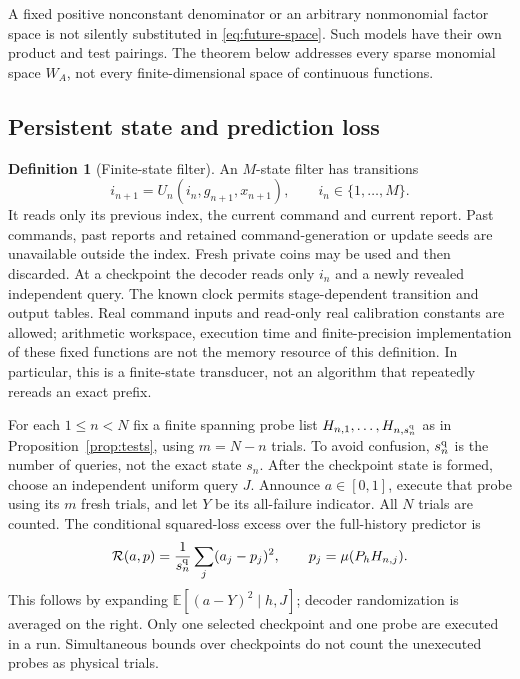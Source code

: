 \documentclass[11pt]{amsart}
\theoremstyle{definition}\newtheorem{definition}[theorem]{Definition}
\theoremstyle{remark}\newtheorem{remark}[theorem]{Remark}
\newcommand{\E}{\mathbb E}\newcommand{\Prob}{\mathbb P}
\begin{document}
A fixed positive nonconstant denominator or an arbitrary nonmonomial
factor space is not silently substituted in \eqref{eq:future-space}.
Such models have their own product and test pairings. The theorem below
addresses every sparse monomial space $W_A$, not every finite-dimensional
space of continuous functions.

\subsection{Persistent state and prediction loss}
\begin{definition}[Finite-state filter]\label{def:finite-state}
An $M$-state filter has transitions
\[
 i_{n+1}=U_n(i_n,g_{n+1},x_{n+1}),\qquad i_n\in\{1,\ldots,M\}.
\]
It reads only its previous index, the current command and current report.
Past commands, past reports and retained command-generation or update seeds
are unavailable outside the index. Fresh private coins may be used and
then discarded. At a checkpoint the decoder reads only $i_n$ and a newly
revealed independent query. The known clock permits stage-dependent
transition and output tables. Real command inputs and read-only real
calibration constants are allowed; arithmetic workspace, execution time and
finite-precision implementation of these fixed functions are not the memory
resource of this definition. In particular, this is a finite-state
transducer, not an algorithm that repeatedly rereads an exact prefix.
\end{definition}

For each $1\le n<N$ fix a finite spanning probe list
$H_{n,1},\ldots,H_{n,s_n^{\rm q}}$ as in
Proposition~\ref{prop:tests}, using $m=N-n$ trials. To avoid confusion,
$s_n^{\rm q}$ is the number of queries, not the exact state $s_n$.
After the checkpoint state is formed, choose an independent uniform query
$J$. Announce $a\in[0,1]$, execute that probe using its $m$ fresh trials,
and let $Y$ be its all-failure indicator. All $N$ trials are counted.
The conditional squared-loss excess over the full-history predictor is
\begin{equation}\label{eq:brier}
 \mathcal R(a,p)=\frac1{s_n^{\rm q}}\sum_j(a_j-p_j)^2,
 \qquad p_j=\mu(P_hH_{n,j}).
\end{equation}
This follows by expanding $\E[(a-Y)^2\mid h,J]$; decoder randomization
is averaged on the right. Only one selected checkpoint and one probe are
executed in a run. Simultaneous bounds over checkpoints do not count the
unexecuted probes as physical trials.
\end{document}
